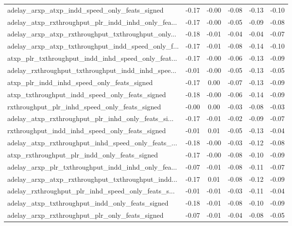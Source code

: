 \begin{tabular}{|l|*{4}{c}|r|}
adelay\_arxp\_atxp\_indd\_speed\_only\_feats\_signed      & -0.17 & -0.00 &   -0.08 &      -0.13 & -0.10 \\
adelay\_atxp\_rxthroughput\_plr\_indd\_inhd\_only\_fea... & -0.17 & -0.00 &   -0.05 &      -0.09 & -0.08 \\
adelay\_arxp\_atxp\_rxthroughput\_txthroughput\_only... & -0.18 & -0.01 &   -0.04 &      -0.04 & -0.07 \\
adelay\_arxp\_atxp\_txthroughput\_indd\_speed\_only\_f... & -0.17 & -0.01 &   -0.08 &      -0.14 & -0.10 \\
atxp\_plr\_txthroughput\_indd\_inhd\_speed\_only\_feat... & -0.17 & -0.00 &   -0.06 &      -0.13 & -0.09 \\
adelay\_rxthroughput\_txthroughput\_indd\_inhd\_spee... & -0.01 & -0.00 &   -0.05 &      -0.13 & -0.05 \\
atxp\_plr\_indd\_inhd\_speed\_only\_feats\_signed         & -0.17 &  0.00 &   -0.07 &      -0.13 & -0.09 \\
atxp\_txthroughput\_indd\_speed\_only\_feats\_signed     & -0.18 & -0.00 &   -0.06 &      -0.14 & -0.09 \\
rxthroughput\_plr\_inhd\_speed\_only\_feats\_signed      & -0.00 &  0.00 &   -0.03 &      -0.08 & -0.03 \\
adelay\_atxp\_rxthroughput\_plr\_inhd\_only\_feats\_si... & -0.17 & -0.01 &   -0.02 &      -0.09 & -0.07 \\
rxthroughput\_indd\_inhd\_speed\_only\_feats\_signed     & -0.01 &  0.01 &   -0.05 &      -0.13 & -0.04 \\
adelay\_atxp\_rxthroughput\_inhd\_speed\_only\_feats\_... & -0.18 & -0.00 &   -0.03 &      -0.12 & -0.08 \\
atxp\_rxthroughput\_plr\_indd\_only\_feats\_signed       & -0.17 & -0.00 &   -0.08 &      -0.10 & -0.09 \\
adelay\_arxp\_plr\_txthroughput\_indd\_inhd\_only\_fea... & -0.07 & -0.01 &   -0.08 &      -0.11 & -0.07 \\
adelay\_arxp\_atxp\_rxthroughput\_txthroughput\_indd... & -0.17 &  0.01 &   -0.08 &      -0.12 & -0.09 \\
adelay\_rxthroughput\_plr\_inhd\_speed\_only\_feats\_s... & -0.01 & -0.01 &   -0.03 &      -0.11 & -0.04 \\
adelay\_atxp\_txthroughput\_indd\_only\_feats\_signed    & -0.18 & -0.01 &   -0.08 &      -0.10 & -0.09 \\
adelay\_arxp\_rxthroughput\_plr\_only\_feats\_signed     & -0.07 & -0.01 &   -0.04 &      -0.08 & -0.05 \\

\end{tabular}
